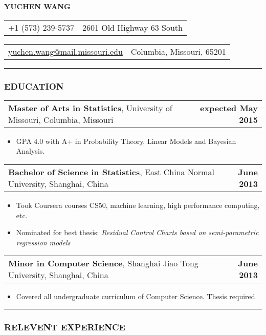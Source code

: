\documentclass[11pt]{article}
\makeatletter
\newcommand{\headerrow}[2]
{\begin{tabular*}{\linewidth}{l@{\extracolsep{\fill}}r}
	#1 & #2 \\
\end{tabular*}
}
\makeatother
\begin{document}
\begin{center}
	\huge\textbf{YUCHEN WANG}
\end{center}

\noindent\headerrow{+1 (573) 239-5737}{2601 Old Highway 63 South}
\headerrow
{\href{mailto:yuchen.wang@mail.missouri.edu}{yuchen.wang@mail.missouri.edu}}
{Columbia, Missouri, 65201}

\vspace{-.8em}
\hrule

\subsubsection*{\centering EDUCATION}
\vspace{-.3em}

\headerrow
	{\textbf{Master of Arts in Statistics}, University of Missouri, Columbia, Missouri}
	{\textbf{expected May 2015}}
	\begin{itemize}
		\item GPA 4.0 with A+ in Probability Theory, Linear Models and Bayesian Analysis.
	\end{itemize}

\noindent\headerrow
	{\textbf{Bachelor of Science in Statistics}, East China Normal University, Shanghai, China}
	{\textbf{June 2013}}
	\begin{itemize}
		\item Took Coursera courses CS50, machine learning, high performance computing, etc.
		\item Nominated for best thesis: \textit{Residual Control Charts based on semi-parametric regression models}
	\end{itemize}

\noindent\headerrow
	{\textbf{Minor in Computer Science}, Shanghai Jiao Tong University, Shanghai, China}
	{\textbf{June 2013}}
	\begin{itemize}
		\item Covered all undergraduate curriculum of Computer Science. Thesis required.
	\end{itemize}

	\vspace{-.3em}
\vspace{0.2em}
\hrule


\subsubsection*{\centering RELEVENT EXPERIENCE}
\vspace{-.3em}
\end{document}
